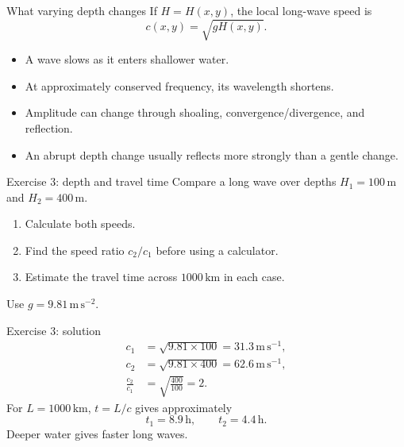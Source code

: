 \documentclass[aspectratio=169]{beamer}
\newcommand{\unit}[1]{\,\mathrm{#1}}
\begin{document}
\begin{frame}{What varying depth changes}
  If $H=H(x,y)$, the local long-wave speed is
  \[
    c(x,y)=\sqrt{gH(x,y)}.
  \]
  \begin{itemize}
    \item A wave slows as it enters shallower water.
    \item At approximately conserved frequency, its wavelength shortens.
    \item Amplitude can change through shoaling, convergence/divergence, and reflection.
    \item An abrupt depth change usually reflects more strongly than a gentle change.
  \end{itemize}
\end{frame}


\begin{frame}{Exercise 3: depth and travel time}
  Compare a long wave over depths $H_1=100\unit{m}$ and $H_2=400\unit{m}$.
  \begin{enumerate}
    \item Calculate both speeds.
    \item Find the speed ratio $c_2/c_1$ before using a calculator.
    \item Estimate the travel time across $1000\unit{km}$ in each case.
  \end{enumerate}
  Use $g=9.81\unit{m\,s^{-2}}$.
\end{frame}

\begin{frame}{Exercise 3: solution}
  \begin{align*}
    c_1 &= \sqrt{9.81\times100}=31.3\unit{m\,s^{-1}},\\
    c_2 &= \sqrt{9.81\times400}=62.6\unit{m\,s^{-1}},\\
    \frac{c_2}{c_1} &= \sqrt{\frac{400}{100}}=2.
  \end{align*}
  For $L=1000\unit{km}$, $t=L/c$ gives approximately
  \[
    t_1=8.9\unit{h},\qquad t_2=4.4\unit{h}.
  \]
  Deeper water gives faster long waves.
\end{frame}
\end{document}
